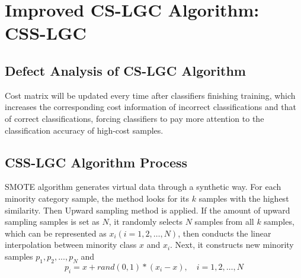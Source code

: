 \documentclass{svjour3}                     %
\begin{document}
\section{Improved CS-LGC Algorithm: CSS-LGC}
\subsection{Defect Analysis of CS-LGC Algorithm}

Cost matrix will be updated every time after classifiers finishing training, which increases the corresponding cost information of incorrect classifications and that of correct classifications, forcing classifiers to pay more attention to the classification accuracy of high-cost samples.

\subsection{CSS-LGC Algorithm Process}\label{subsec:css-lgc-pro}
 SMOTE algorithm generates virtual data through a synthetic way. For each minority category sample, the method looks for its $k$ samples with the highest similarity. Then Upward sampling method is applied. If the amount of upward sampling samples is set as $N$, it randomly selects $N$ samples from all $k$ samples, which can be represented as ${x_i}\left( {i = 1,2, \ldots ,N} \right)$, then conducts the linear interpolation between minority class $x$ and $x_i$. Next, it constructs new minority samples ${p_1},{p_2},...,{p_N}$ and 
 \begin{equation}\label{formula:init}
  {p_i} = x + rand(0,1)*({x_i} - x), \quad i = 1,2,\ldots,N
 \end{equation}
\end{document}
